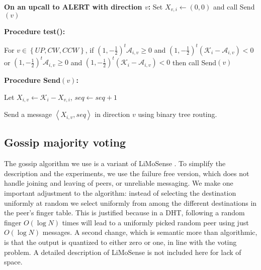 \documentclass[12pt,english,journal]{elsarticle}
\numberwithin{equation}{section}
\numberwithin{figure}{section}
\theoremstyle{plain}
\theoremstyle{plain}
\begin{document}
\begin{algorithm}
\noindent \begin{raggedright}
\textbf{On an upcall to ALERT with direction $v$:} Set $X_{v,i}\leftarrow\left(0,0\right)$
and call Send$\left(v\right)$
\par\end{raggedright}

\noindent \begin{raggedright}
\textbf{Procedure test():}
\par\end{raggedright}

\noindent \begin{raggedright}
For $v\in\left\{ UP,CW,CCW\right\} $, if $\left(1,-\frac{1}{2}\right)^{t}\mathcal{A}_{i,v}\geq0$
and $\left(1,-\frac{1}{2}\right)^{t}\left(\mathcal{K}_{i}-\mathcal{A}_{i,v}\right)<0$
or $\left(1,-\frac{1}{2}\right)^{t}\mathcal{A}_{i,v}\geq0$ and $\left(1,-\frac{1}{2}\right)^{t}\left(\mathcal{K}_{i}-\mathcal{A}_{i,v}\right)<0$
then call Send$\left(v\right)$
\par\end{raggedright}

\noindent \begin{raggedright}
\textbf{Procedure Send$\left(v\right)$:}
\par\end{raggedright}

\noindent \begin{raggedright}
Let $X_{i,v}\leftarrow\mathcal{K}_{i}-X_{v,i}$, $seq\leftarrow seq+1$
\par\end{raggedright}

\noindent \raggedright{}Send a message $\left\langle X_{i,v},seq\right\rangle $
in direction $v$ using binary tree routing.
\end{algorithm}



\subsection{Gossip majority voting}

The gossip algorithm we use is a variant of LiMoSense \citep{dynamicGossip}.
To simplify the description and the experiments, we use the failure
free version, which does not handle joining and leaving of peers,
or unreliable messaging. We make one important adjustment to the algorithm:
instead of selecting the destination uniformly at random we select
uniformly from among the different destinations in the peer's finger
table. This is justified because in a DHT, following a random finger
$O\left(\log N\right)$ times will lead to a uniformly picked random
peer using just $O\left(\log N\right)$ messages. A second change,
which is semantic more than algorithmic, is that the output is quantized
to either zero or one, in line with the voting problem. A detailed
description of LiMoSense is not included here for lack of space.
\end{document}
